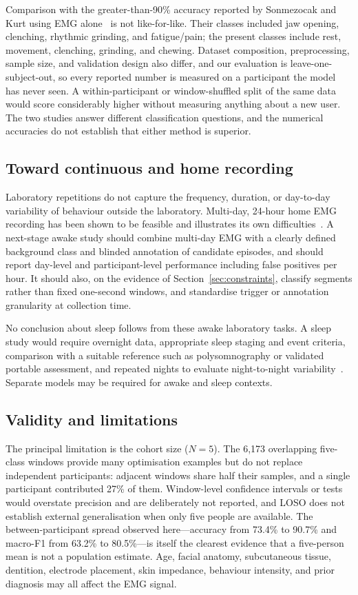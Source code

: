 \documentclass[pdflatex,sn-nature,iicol]{sn-jnl}
\begin{document}
Comparison with the greater-than-90\% accuracy reported by Sonmezocak and Kurt using EMG alone~\cite{sonmezocak2021detection} is not like-for-like. Their classes included jaw opening, clenching, rhythmic grinding, and fatigue/pain; the present classes include rest, movement, clenching, grinding, and chewing. Dataset composition, preprocessing, sample size, and validation design also differ, and our evaluation is leave-one-subject-out, so every reported number is measured on a participant the model has never seen. A within-participant or window-shuffled split of the same data would score considerably higher without measuring anything about a new user. The two studies answer different classification questions, and the numerical accuracies do not establish that either method is superior.

\subsection{Toward continuous and home recording}

Laboratory repetitions do not capture the frequency, duration, or day-to-day variability of behaviour outside the laboratory. Multi-day, 24-hour home EMG recording has been shown to be feasible and illustrates its own difficulties~\cite{colonna2023electromyographic}. A next-stage awake study should combine multi-day EMG with a clearly defined background class and blinded annotation of candidate episodes, and should report day-level and participant-level performance including false positives per hour. It should also, on the evidence of Section~\ref{sec:constraints}, classify segments rather than fixed one-second windows, and standardise trigger or annotation granularity at collection time.

No conclusion about sleep follows from these awake laboratory tasks. A sleep study would require overnight data, appropriate sleep staging and event criteria, comparison with a suitable reference such as polysomnography or validated portable assessment, and repeated nights to evaluate night-to-night variability~\cite{cidverdejo2024instrumental}. Separate models may be required for awake and sleep contexts.

\subsection{Validity and limitations}

The principal limitation is the cohort size ($N=5$). The 6,173 overlapping five-class windows provide many optimisation examples but do not replace independent participants: adjacent windows share half their samples, and a single participant contributed 27\% of them. Window-level confidence intervals or tests would overstate precision and are deliberately not reported, and LOSO does not establish external generalisation when only five people are available. The between-participant spread observed here---accuracy from 73.4\% to 90.7\% and macro-F1 from 63.2\% to 80.5\%---is itself the clearest evidence that a five-person mean is not a population estimate. Age, facial anatomy, subcutaneous tissue, dentition, electrode placement, skin impedance, behaviour intensity, and prior diagnosis may all affect the EMG signal.
\end{document}
